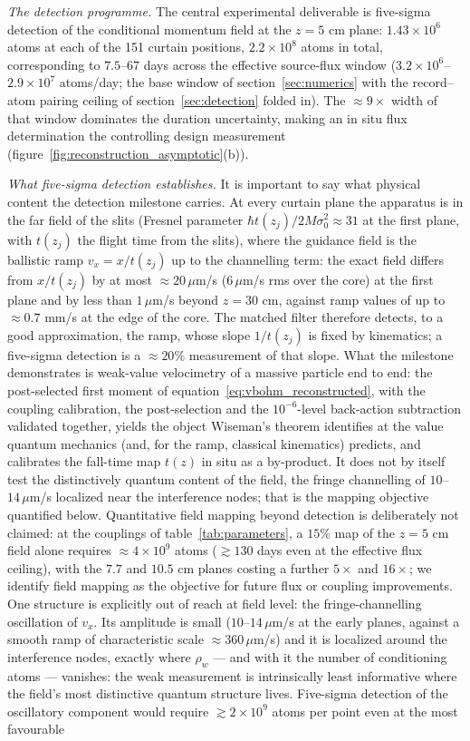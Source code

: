 \documentclass[11pt,a4paper]{article}
\begin{document}
\emph{The detection programme.} The central experimental deliverable is five-sigma detection of the conditional momentum field at the $z = 5$ cm plane: $1.43\times 10^6$ atoms at each of the 151 curtain positions, $2.2\times 10^8$ atoms in total, corresponding to $7.5$--$67$ days across the effective source-flux window ($3.2\times 10^6$--$2.9\times 10^7$ atoms/day; the base window of section~\ref{sec:numerics} with the record--atom pairing ceiling of section~\ref{sec:detection} folded in). The $\approx 9\times$ width of that window dominates the duration uncertainty, making an in situ flux determination the controlling design measurement (figure~\ref{fig:reconstruction_asymptotic}(b)).

\emph{What five-sigma detection establishes.} It is important to say what physical content the detection milestone carries. At every curtain plane the apparatus is in the far field of the slits (Fresnel parameter $\hbar t(z_j)/2M\sigma_0^2 \approx 31$ at the first plane, with $t(z_j)$ the flight time from the slits), where the guidance field is the ballistic ramp $v_x = x/t(z_j)$ up to the channelling term: the exact field differs from $x/t(z_j)$ by at most $\approx 20\,\mu$m/s ($6\,\mu$m/s rms over the core) at the first plane and by less than $1\,\mu$m/s beyond $z = 30$ cm, against ramp values of up to $\approx 0.7$ mm/s at the edge of the core. The matched filter therefore detects, to a good approximation, the ramp, whose slope $1/t(z_j)$ is fixed by kinematics; a five-sigma detection is a $\approx 20\%$ measurement of that slope. What the milestone demonstrates is weak-value velocimetry of a massive particle end to end: the post-selected first moment of equation~\eqref{eq:vbohm_reconstructed}, with the coupling calibration, the post-selection and the $10^{-6}$-level back-action subtraction validated together, yields the object Wiseman's theorem identifies at the value quantum mechanics (and, for the ramp, classical kinematics) predicts, and calibrates the fall-time map $t(z)$ in situ as a by-product. It does not by itself test the distinctively quantum content of the field, the fringe channelling of $10$--$14\,\mu$m/s localized near the interference nodes; that is the mapping objective quantified below. Quantitative field mapping beyond detection is deliberately not claimed: at the couplings of table~\ref{tab:parameters}, a $15\%$ map of the $z = 5$ cm field alone requires $\approx 4\times 10^9$ atoms ($\gtrsim 130$ days even at the effective flux ceiling), with the $7.7$ and $10.5$ cm planes costing a further $5\times$ and $16\times$; we identify field mapping as the objective for future flux or coupling improvements. One structure is explicitly out of reach at field level: the fringe-channelling oscillation of $v_x$. Its amplitude is small ($10$--$14\,\mu$m/s at the early planes, against a smooth ramp of characteristic scale $\approx 360\,\mu$m/s) and it is localized around the interference nodes, exactly where $\rho_w$ --- and with it the number of conditioning atoms --- vanishes: the weak measurement is intrinsically least informative where the field's most distinctive quantum structure lives. Five-sigma detection of the oscillatory component would require $\gtrsim 2\times 10^9$ atoms per point even at the most favourable 
\end{document}
